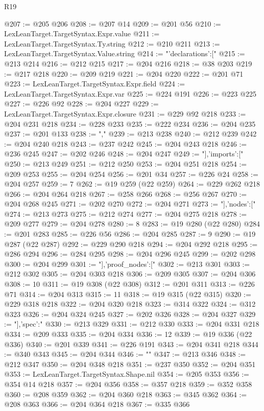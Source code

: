 \begin{lexlean}{R19}
\begin{coremodule}
@207 := @205 @206
@208 := @207 @14
@209 := @201 @56
@210 := LexLeanTarget.TargetSyntax.Expr.value
@211 := LexLeanTarget.TargetSyntax.Ty.string
@212 := @210 @211
@213 := LexLeanTarget.TargetSyntax.Value.string
@214 := "{'declarations':["
@215 := @213 @214
@216 := @212 @215
@217 := @204 @216
@218 := @38 @203
@219 := @217 @218
@220 := @209 @219
@221 := @204 @220
@222 := @201 @71
@223 := LexLeanTarget.TargetSyntax.Expr.field
@224 := LexLeanTarget.TargetSyntax.Expr.var
@225 := @224 @191
@226 := @223 @225
@227 := @226 @92
@228 := @204 @227
@229 := LexLeanTarget.TargetSyntax.Expr.closure
@231 := @229 @92 @218
@233 := @204 @231 @218
@234 := @228 @233
@235 := @222 @234
@236 := @204 @235
@237 := @201 @133
@238 := ","
@239 := @213 @238
@240 := @212 @239
@242 := @204 @240 @218
@243 := @237 @242
@245 := @204 @243 @218
@246 := @236 @245
@247 := @202 @246
@248 := @204 @247
@249 := "],'imports':["
@250 := @213 @249
@251 := @212 @250
@253 := @204 @251 @218
@254 := @209 @253
@255 := @204 @254
@256 := @201 @34
@257 := @226 @24
@258 := @204 @257
@259 := 7
@262 := @19 @259 (@22 @259)
@264 := @229 @262 @218
@266 := @204 @264 @218
@267 := @258 @266
@268 := @256 @267
@270 := @204 @268 @245
@271 := @202 @270
@272 := @204 @271
@273 := "],'nodes':["
@274 := @213 @273
@275 := @212 @274
@277 := @204 @275 @218
@278 := @209 @277
@279 := @204 @278
@280 := 8
@283 := @19 @280 (@22 @280)
@284 := @201 @283
@285 := @226 @56
@286 := @204 @285
@287 := 9
@290 := @19 @287 (@22 @287)
@292 := @229 @290 @218
@294 := @204 @292 @218
@295 := @286 @294
@296 := @284 @295
@298 := @204 @296 @245
@299 := @202 @298
@300 := @204 @299
@301 := "],'proof_nodes':["
@302 := @213 @301
@303 := @212 @302
@305 := @204 @303 @218
@306 := @209 @305
@307 := @204 @306
@308 := 10
@311 := @19 @308 (@22 @308)
@312 := @201 @311
@313 := @226 @71
@314 := @204 @313
@315 := 11
@318 := @19 @315 (@22 @315)
@320 := @229 @318 @218
@322 := @204 @320 @218
@323 := @314 @322
@324 := @312 @323
@326 := @204 @324 @245
@327 := @202 @326
@328 := @204 @327
@329 := "],'spec':"
@330 := @213 @329
@331 := @212 @330
@333 := @204 @331 @218
@334 := @209 @333
@335 := @204 @334
@336 := 12
@339 := @19 @336 (@22 @336)
@340 := @201 @339
@341 := @226 @191
@343 := @204 @341 @218
@344 := @340 @343
@345 := @204 @344
@346 := "}"
@347 := @213 @346
@348 := @212 @347
@350 := @204 @348 @218
@351 := @237 @350
@352 := @204 @351
@353 := LexLeanTarget.TargetSyntax.Shape.nil
@354 := @205 @353
@356 := @354 @14 @218
@357 := @204 @356
@358 := @357 @218
@359 := @352 @358
@360 := @208 @359
@362 := @204 @360 @218
@363 := @345 @362
@364 := @208 @363
@366 := @204 @364 @218
@367 := @335 @366

\end{coremodule}
\end{lexlean}
